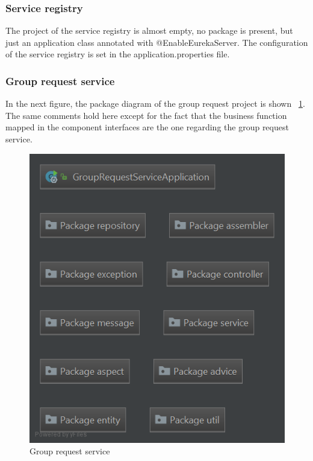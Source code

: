 \subsubsection{Service registry}
The project of the service registry is almost empty, no package is present, but just an application class annotated with 
@EnableEurekaServer. The configuration of the service registry is set in the application.properties file.

\subsubsection{Group request service}
In the next figure, the package diagram of the group request project is shown ~\ref{fig:pkggrouprequest}. \\
The same comments hold here except for the fact that the business function mapped in the component interfaces are the one regarding
the group request service. 

\begin{figure}[H]
\includegraphics[width=\linewidth]{images/PackageGrouprequestservice.png}
\caption{ Group request service }
\label{fig:pkggrouprequest}
\end{figure}


